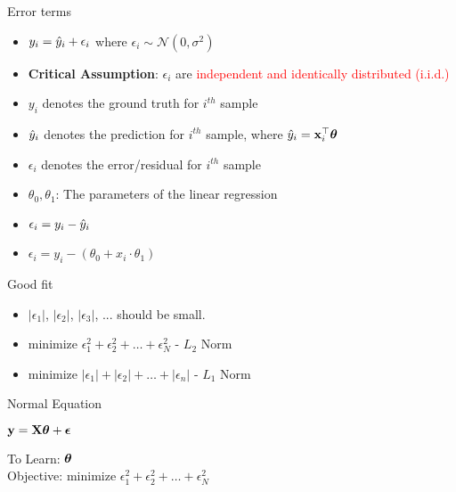 \documentclass{beamer}
\begin{document}
\begin{frame}{Error terms}


	\begin{itemize}[<+->]
		\item $y_{i} = \hat{y}_i + \epsilon_{i}$ where $\epsilon_{i} \sim \mathcal{N}(0, \sigma^2)$
		\item \textbf{Critical Assumption}: $\epsilon_{i}$ are \textcolor{red}{independent and identically distributed (i.i.d.)}
		\item $y_{i}$ denotes the ground truth for $i^{th}$ sample
		\item $\hat{y}_i$ denotes the prediction for $i^{th}$ sample, where $\hat{y}_i = \mathbf{x}_{i}^\top \boldsymbol{\theta}$
		\item $\epsilon_{i}$ denotes the error/residual for $i^{th}$ sample
		\item $\theta_{0}, \theta_{1}$: The parameters of the linear regression
		\item   $  \epsilon_{i} = y_{i} - \hat{y}_i$
		\item     $\epsilon_{i} = y_{i} - (\theta_{0} + x_{i} \cdot \theta_{1})$

\end{itemize}





\end{frame}



\begin{frame}{Good fit}

\begin{itemize}
    \item<+-> $|\epsilon_{1}|$, $|\epsilon_{2}|$, $|\epsilon_{3}|$, ... should be small.
    \item<+-> 
${\text{minimize }} \epsilon_{1}^2 + \epsilon_{2}^2 + \dots + \epsilon_{N}^2$ - $L_{2}$ Norm
    \item<+-> 
${\text{minimize }} |\epsilon_{1}| + |\epsilon_{2}| + \dots + |\epsilon_{n}|$ - $L_{1}$ Norm
\end{itemize}
\end{frame}





\begin{frame}{Normal Equation}
    
    
   \pause  \begin{tcolorbox}
       $ \mathbf{y} = \mathbf{X}\boldsymbol{\theta} + \boldsymbol{\epsilon}$
    \end{tcolorbox}
    
    \pause To Learn: $\boldsymbol{\theta}$ \\
    \pause Objective: ${\text{minimize }} \epsilon_{1}^2 + \epsilon_{2}^2 + \dots + \epsilon_{N}^2$  
\end{frame}
\end{document}
